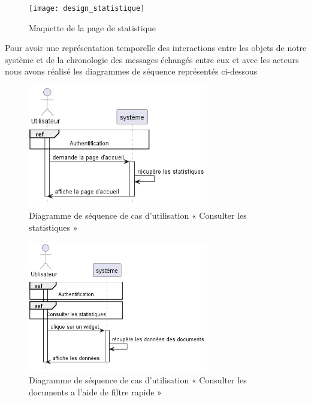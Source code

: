 \begin{figure}[H]
  \centering
  \texttt{[image: design\_statistique]}
  \caption{Maquette de la page de statistique}
  \label{fig:design_statistique}
\end{figure}


Pour avoir une représentation temporelle des interactions entre les objets de notre système et de la chronologie des messages échangés entre eux et avec les acteurs nous avons réalisé les diagrammes de séquence représentés ci-dessous

\begin{figure}[H]
  \centering
  \includegraphics[width=0.7\textwidth]{out/diagrams/sprint7/view_stats/view_stats}
  \caption{Diagramme de séquence de cas d'utilisation « Consulter les statistiques »}
  \label{fig:sequence_view_stats}
\end{figure}

\begin{figure}[H]
  \centering
  \includegraphics[width=0.7\textwidth]{out/diagrams/sprint7/docs_quick_filter/docs_quick_filter}
  \caption{Diagramme de séquence de cas d'utilisation « Consulter les documents a l'aide de filtre rapide »}
  \label{fig:sequence_docs_quick_filter}
\end{figure}

